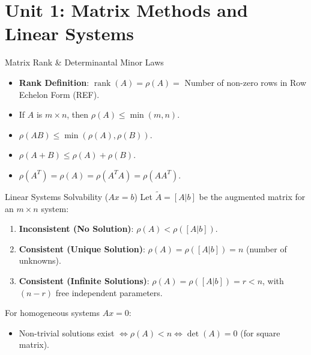 \chapter{Unit 1: Matrix Methods and Linear Systems}

\begin{formulabox}{Matrix Rank \& Determinantal Minor Laws}
\begin{itemize}[leftmargin=1.5em]
    \item \textbf{Rank Definition}: $\operatorname{rank}(A) = \rho(A) = $ Number of non-zero rows in Row Echelon Form (REF).
    \item If $A$ is $m \times n$, then $\rho(A) \le \min(m, n)$.
    \item $\rho(AB) \le \min(\rho(A), \rho(B))$.
    \item $\rho(A + B) \le \rho(A) + \rho(B)$.
    \item $\rho(A^T) = \rho(A) = \rho(A^T A) = \rho(A A^T)$.
\end{itemize}
\end{formulabox}

\begin{formulabox}{Linear Systems Solvability ($Ax=b$)}
Let $\tilde{A} = [A | b]$ be the augmented matrix for an $m \times n$ system:
\begin{enumerate}[leftmargin=1.5em]
    \item \textbf{Inconsistent (No Solution)}: $\rho(A) < \rho([A|b])$.
    \item \textbf{Consistent (Unique Solution)}: $\rho(A) = \rho([A|b]) = n$ (number of unknowns).
    \item \textbf{Consistent (Infinite Solutions)}: $\rho(A) = \rho([A|b]) = r < n$, with $(n - r)$ free independent parameters.
\end{enumerate}
For homogeneous systems $Ax = 0$:
\begin{itemize}
    \item Non-trivial solutions exist $\iff \rho(A) < n \iff \det(A) = 0$ (for square matrix).
\end{itemize}
\end{formulabox}

